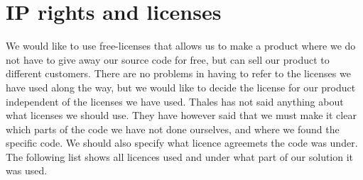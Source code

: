 
\section{IP rights and  licenses}\label{sec:rightlic}
We would like to use free-licenses that allows us to make a product where we do not have to give away our source code for free, but can sell our product to different customers. There are no problems in having to refer to the licenses we have used along the way, but we would like to decide the license for our product independent of the licenses we have used. 
\newline
\newline
Thales has not said anything about what licenses we should use. They have however said that we must make it clear which parts of the code we have not done ourselves, and where we found the specific code. We should also specify what licence agreemets the code was under. 
\newline
\newline
The following list shows all licences used and under what part of our solution it was used.

